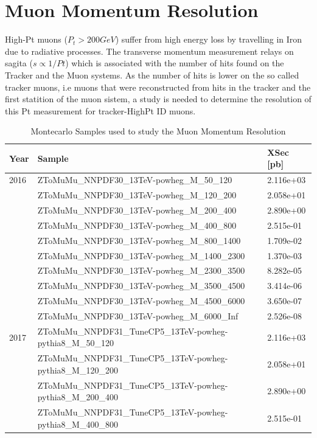 \section{Muon Momentum Resolution}

High-Pt muons ($P_{t}>200GeV$) suffer from high energy loss by travelling in Iron
due to radiative processes. The transverse momentum measurement relays on
sagita ($s \propto 1/Pt$) which is associated with the number of hits found on
the Tracker and the Muon systems. As the number of hits is lower on the so called
tracker muons, i.e muons that were reconstructed from hits in the tracker and the
first statition of the muon sistem, a study is needed to determine
the resolution of this Pt measurement for tracker-HighPt ID muons.

\begin{table}
\begin{center}
  \caption{Montecarlo Samples used to study the Muon Momentum Resolution}
\footnotesize
\begin{tabular}{|l|l|l|}
\hline
Year & Sample & XSec [pb] \\ \hline
\hline
2016 & ZToMuMu\_NNPDF30\_13TeV-powheg\_M\_50\_120 & 2.116e+03\\
&ZToMuMu\_NNPDF30\_13TeV-powheg\_M\_120\_200 & 2.058e+01\\
&ZToMuMu\_NNPDF30\_13TeV-powheg\_M\_200\_400 & 2.890e+00\\
&ZToMuMu\_NNPDF30\_13TeV-powheg\_M\_400\_800 & 2.515e-01\\
&ZToMuMu\_NNPDF30\_13TeV-powheg\_M\_800\_1400 & 1.709e-02\\
&ZToMuMu\_NNPDF30\_13TeV-powheg\_M\_1400\_2300 & 1.370e-03\\
&ZToMuMu\_NNPDF30\_13TeV-powheg\_M\_2300\_3500 & 8.282e-05\\
&ZToMuMu\_NNPDF30\_13TeV-powheg\_M\_3500\_4500 & 3.414e-06\\
&ZToMuMu\_NNPDF30\_13TeV-powheg\_M\_4500\_6000 & 3.650e-07\\
&ZToMuMu\_NNPDF30\_13TeV-powheg\_M\_6000\_Inf & 2.526e-08\\
\hline
2017 & ZToMuMu\_NNPDF31\_TuneCP5\_13TeV-powheg-pythia8\_M\_50\_120 & 2.116e+03\\
&ZToMuMu\_NNPDF31\_TuneCP5\_13TeV-powheg-pythia8\_M\_120\_200 & 2.058e+01\\
&ZToMuMu\_NNPDF31\_TuneCP5\_13TeV-powheg-pythia8\_M\_200\_400 & 2.890e+00\\
&ZToMuMu\_NNPDF31\_TuneCP5\_13TeV-powheg-pythia8\_M\_400\_800 & 2.515e-01\\

\end{tabular}
\end{center}
\end{table}
